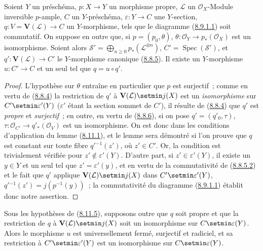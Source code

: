 \begin{lemma}[8.11.5]
\label{II.8.11.5-fr}
Soient $Y$ un préschéma, $p:X\to Y$ un morphisme propre, $\mathcal{L}$ un
$\mathcal{O}_X$-Module inversible $p$-ample, $C$ un $Y$-préschéma,
$\varepsilon:Y\to C$ une $Y$-section,
$q:V=\mathbf{V}(\mathcal{L})\to C$ un $Y$-morphisme, tels que le diagramme
\textup{(\hyperref[II.8.9.1.1-fr]{8.9.1.1})} soit commutatif. On suppose en outre que,
si $p=(p_0,\theta)$,
$\theta:\mathcal{O}_Y\to p_*(\mathcal{O}_X)$ est un isomorphisme. Soient alors
$\mathcal{S}'=\bigoplus_{n\geqslant0}p_*(\mathcal{L}^{\otimes n})$,
$C'=\operatorname{Spec}(\mathcal{S}')$, et
$q':\mathbf{V}(\mathcal{L})\to C'$ le $Y$-morphisme canonique
\textup{(\hyperref[II.8.8.5-fr]{8.8.5})}. Il existe un $Y$-morphisme $u:C'\to C$ et
un seul tel que $q=u\circ q'$.
\end{lemma}

\begin{proof}
L'hypothèse sur $\theta$ entraîne en particulier que $p$ est surjectif~;
comme en vertu de (\hyperref[II.8.8.4-fr]{8.8.4}) la restriction de $q'$ à
$\mathbf{V}(\mathcal{L})\setmin j(X)$ est un \emph{isomorphisme} sur
$C'\setmin\varepsilon'(Y)$ ($\varepsilon'$ étant la section sommet de $C'$), il
résulte de (\hyperref[II.8.8.4-fr]{8.8.4}) que $q'$ est \emph{propre} et
\emph{surjectif}~; en outre, en vertu de (\hyperref[II.8.8.6-fr]{8.8.6}), si on pose
$q'=(q'_0,\tau)$,
$\tau:\mathcal{O}_{C'}\to q'_*(\mathcal{O}_V)$ est un isomorphisme. On est
donc dans les conditions d'application du lemme
(\hyperref[II.8.11.1-fr]{8.11.1}), et le lemme sera démontré si l'on prouve
que $q$ est constant sur toute fibre $q'{}^{-1}(z')$, où $z'\in C'$. Or, la
condition est trivialement vérifiée pour $z'\notin\varepsilon'(Y)$. D'autre
part, si $z'\in\varepsilon'(Y)$, il existe un $y\in Y$ et un seul tel que
$z'=\varepsilon'(y)$, et en vertu de la commutativité de
(\hyperref[II.8.8.5.2-fr]{8.8.5.2}) et le fait que $q'$ applique
$\mathbf{V}(\mathcal{L})\setmin j(X)$ dans $C'\setmin\varepsilon'(Y)$,
$q'{}^{-1}(z')=j(p^{-1}(y))$~; la commutativité du diagramme
(\hyperref[II.8.9.1.1-fr]{8.9.1.1}) établit donc notre assertion.
\end{proof}

\begin{corollary}[8.11.6]
\label{II.8.11.6-fr}
Sous les hypothèses de \textup{(\hyperref[II.8.11.5-fr]{8.11.5})}, supposons outre que
$q$ soit propre et que la restriction de $q$ à
$\mathbf{V}(\mathcal{L})\setmin j(X)$ soit un isomorphisme sur
$C\setmin\varepsilon(Y)$. Alors le morphisme $u$ est universellement fermé,
surjectif et radiciel, et sa restriction à $C'\setmin\varepsilon'(Y)$ est un
isomorphisme sur $C\setmin\varepsilon(Y)$.
\end{corollary}

